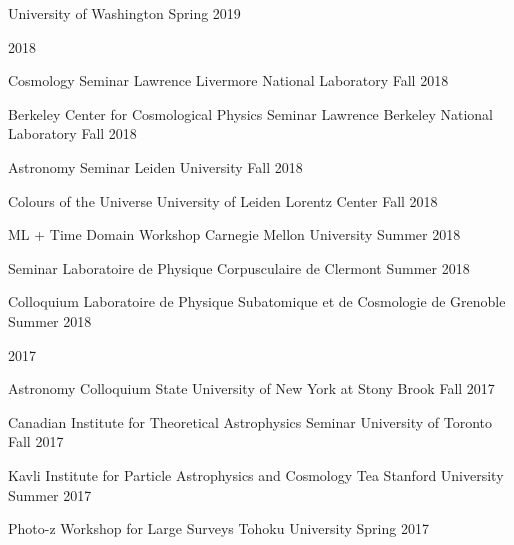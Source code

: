 \documentclass[11pt,letterpaper]{article}
\begin{document}
\begin{list}{}{\malzlist}
\begin{list}{}{\malzlist}
	{University of Washington}
	{Spring 2019}
	\end{list}
\item 2018
\nopagebreak\begin{list}{}{\malzlist}
\item {}
  {Cosmology Seminar}
	{Lawrence Livermore National Laboratory}
	{Fall 2018}
\item {}
  {Berkeley Center for Cosmological Physics Seminar}
	{Lawrence Berkeley National Laboratory}
	{Fall 2018}
\item {}
  {Astronomy Seminar}
	{Leiden University}
	{Fall 2018}
\item {}
	{Colours of the Universe}
	{University of Leiden Lorentz Center}
	{Fall 2018}
\item {}
  {ML + Time Domain Workshop}
	{Carnegie Mellon University}
	{Summer 2018}
\item {}
  {Seminar}
	{Laboratoire de Physique Corpusculaire de Clermont}
	{Summer 2018}
\item {}
  {Colloquium}
	{Laboratoire de Physique Subatomique et de Cosmologie de Grenoble}
	{Summer 2018}
\end{list}
\item 2017
\nopagebreak\begin{list}{}{\malzlist}
\item {}
  {Astronomy Colloquium}
	{State University of New York at Stony Brook}
	{Fall 2017}
\item {}
  {Canadian Institute for Theoretical Astrophysics Seminar}
	{University of Toronto}
	{Fall 2017}
\item {}
  {Kavli Institute for Particle Astrophysics and Cosmology Tea}
	{Stanford University}
	{Summer 2017}
\item {}
  {Photo-z Workshop for Large Surveys}
	{Tohoku University}
	{Spring 2017}
\end{list}

\end{list}
\end{document}

